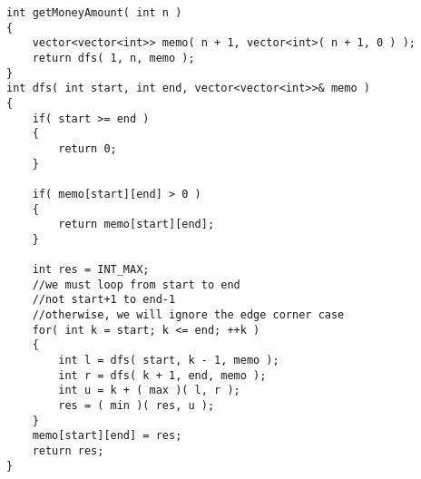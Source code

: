 \begin{lstlisting}[style=customc, caption={Memorization}]
int getMoneyAmount( int n )
{
    vector<vector<int>> memo( n + 1, vector<int>( n + 1, 0 ) );
    return dfs( 1, n, memo );
}
int dfs( int start, int end, vector<vector<int>>& memo )
{
    if( start >= end )
    {
        return 0;
    }

    if( memo[start][end] > 0 )
    {
        return memo[start][end];
    }

    int res = INT_MAX;
    //we must loop from start to end
    //not start+1 to end-1
    //otherwise, we will ignore the edge corner case
    for( int k = start; k <= end; ++k )
    {
        int l = dfs( start, k - 1, memo );
        int r = dfs( k + 1, end, memo );
        int u = k + ( max )( l, r );
        res = ( min )( res, u );
    }
    memo[start][end] = res;
    return res;
}
\end{lstlisting}